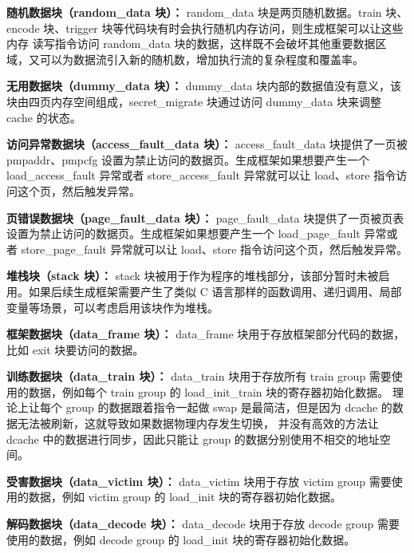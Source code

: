 \textbf{随机数据块（random\_data 块）：}
random\_data 块是两页随机数据。train 块、encode 块、trigger 块等代码块有时会执行随机内存访问，则生成框架可以让这些内存
读写指令访问 random\_data 块的数据，这样既不会破坏其他重要数据区域，又可以为数据流引入新的随机数，增加执行流的复杂程度和覆盖率。\par

\textbf{无用数据块（dummy\_data 块）：}
dummy\_data 块内部的数据值没有意义，该块由四页内存空间组成，secret\_migrate 块通过访问 dummy\_data 块来调整 cache 的状态。\par

\textbf{访问异常数据块（access\_fault\_data 块）：}
access\_fault\_data 块提供了一页被 pmpaddr、pmpcfg 设置为禁止访问的数据页。生成框架如果想要产生一个 load\_access\_fault 异常或者
store\_access\_fault 异常就可以让 load、store 指令访问这个页，然后触发异常。\par

\textbf{页错误数据块（page\_fault\_data 块）：}
page\_fault\_data 块提供了一页被页表设置为禁止访问的数据页。生成框架如果想要产生一个 load\_page\_fault 异常或者
store\_page\_fault 异常就可以让 load、store 指令访问这个页，然后触发异常。\par

\textbf{堆栈块（stack 块）：}
stack 块被用于作为程序的堆栈部分，该部分暂时未被启用。如果后续生成框架需要产生了类似 C 语言那样的函数调用、递归调用、局部变量等场景，可以考虑启用该块作为堆栈。\par

\textbf{框架数据块（data\_frame 块）：}
data\_frame 块用于存放框架部分代码的数据，比如 exit 块要访问的数据。\par

\textbf{训练数据块（data\_train 块）：}
data\_train 块用于存放所有 train group 需要使用的数据，例如每个 train group 的 load\_init\_train 块的寄存器初始化数据。
理论上让每个 group 的数据跟着指令一起做 swap 是最简洁，但是因为 dcache 的数据无法被刷新，这就导致如果数据物理内存发生切换，
并没有高效的方法让 dcache 中的数据进行同步，因此只能让 group 的数据分别使用不相交的地址空间。\par

\textbf{受害数据块（data\_victim 块）：}
data\_victim 块用于存放 victim group 需要使用的数据，例如 victim group 的 load\_init 块的寄存器初始化数据。\par

\textbf{解码数据块（data\_decode 块）：}
data\_decode 块用于存放 decode group 需要使用的数据，例如 decode group 的 load\_init 块的寄存器初始化数据。\par

